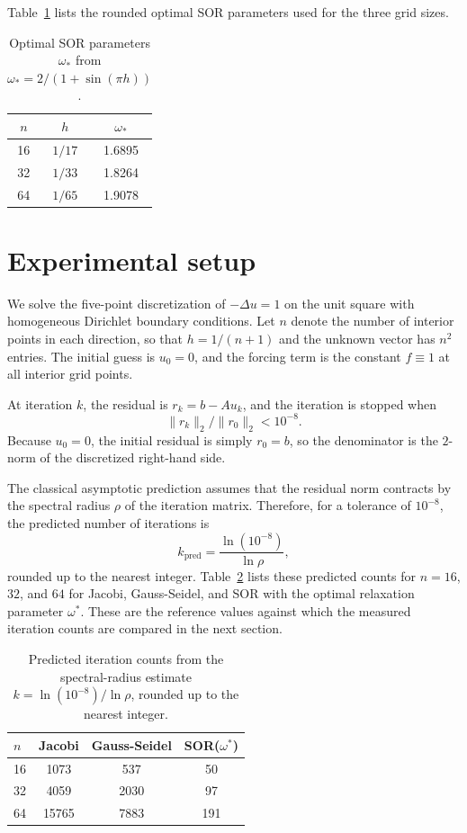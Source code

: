 \documentclass[11pt]{article}
\begin{document}
Table~\ref{tab:omega} lists the rounded optimal SOR parameters used for the three grid sizes.
\begin{table}[h]
\centering
\begin{tabular}{ccc}
\toprule
\(n\) & \(h\) & \(\omega_\ast\) \\
\midrule
16 & \(1/17\) & 1.6895 \\
32 & \(1/33\) & 1.8264 \\
64 & \(1/65\) & 1.9078 \\
\bottomrule
\end{tabular}
\caption{Optimal SOR parameters \(\omega_\ast\) from \(\omega_\ast=2/(1+\sin(\pi h))\).}
\label{tab:omega}
\end{table}
\section{Experimental setup}
We solve the five-point discretization of \(-\Delta u=1\) on the unit square with homogeneous Dirichlet boundary conditions. Let \(n\) denote the number of interior points in each direction, so that \(h=1/(n+1)\) and the unknown vector has \(n^2\) entries. The initial guess is \(u_0=0\), and the forcing term is the constant \(f\equiv 1\) at all interior grid points.

At iteration \(k\), the residual is \(r_k=b-Au_k\), and the iteration is stopped when
\[
\|r_k\|_2/\|r_0\|_2 < 10^{-8}.
\]
Because \(u_0=0\), the initial residual is simply \(r_0=b\), so the denominator is the \(2\)-norm of the discretized right-hand side.

The classical asymptotic prediction assumes that the residual norm contracts by the spectral radius \(\rho\) of the iteration matrix. Therefore, for a tolerance of \(10^{-8}\), the predicted number of iterations is
\[
k_{\mathrm{pred}}=\frac{\ln(10^{-8})}{\ln\rho},
\]
rounded up to the nearest integer. Table~\ref{tab:pred} lists these predicted counts for \(n=16\), \(32\), and \(64\) for Jacobi, Gauss-Seidel, and SOR with the optimal relaxation parameter \(\omega^*\). These are the reference values against which the measured iteration counts are compared in the next section.

\begin{table}[h]
\centering
\begin{tabular}{lccc}
\toprule
\(n\) & Jacobi & Gauss-Seidel & SOR(\(\omega^*\)) \\
\midrule
16 & 1073 & 537 & 50 \\
32 & 4059 & 2030 & 97 \\
64 & 15765 & 7883 & 191 \\
\bottomrule
\end{tabular}
\caption{Predicted iteration counts from the spectral-radius estimate \(k=\ln(10^{-8})/\ln\rho\), rounded up to the nearest integer.}
\label{tab:pred}
\end{table}
\end{document}
